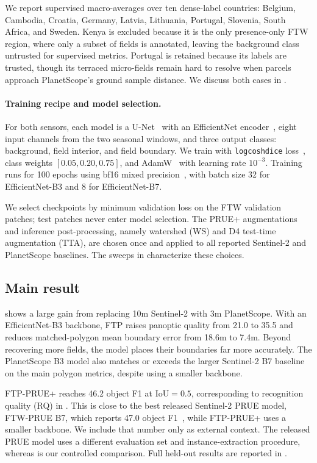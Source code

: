 \documentclass[10pt,twocolumn,letterpaper]{article}
\begin{document}
We report supervised macro-averages over ten dense-label countries: Belgium, Cambodia, Croatia, Germany, Latvia, Lithuania, Portugal, Slovenia, South Africa, and Sweden. Kenya is excluded because it is the only presence-only FTW region, where only a subset of fields is annotated, leaving the background class untrusted for supervised metrics. Portugal is retained because its labels are trusted, though its terraced micro-fields remain hard to resolve when parcels approach PlanetScope's ground sample distance. We discuss both cases in .

\paragraph{Training recipe and model selection.}
For both sensors, each model is a U-Net~\cite{ronneberger2015unet} with an EfficientNet encoder~\cite{tan2019efficientnet}, eight input channels from the two seasonal windows, and three output classes: background, field interior, and field boundary. We train with \texttt{logcoshdice} loss~\cite{milletari2016vnet,jadon2020losses}, class weights $[0.05,0.20,0.75]$, and AdamW~\cite{loshchilov2019adamw} with learning rate $10^{-3}$. Training runs for 100 epochs using bf16 mixed precision~\cite{micikevicius2018mixedprec}, with batch size 32 for EfficientNet-B3 and 8 for EfficientNet-B7.

We select checkpoints by minimum validation loss on the FTW validation patches; test patches never enter model selection. The PRUE+ augmentations and inference post-processing, namely watershed (WS) and D4 test-time augmentation (TTA), are chosen once and applied to all reported Sentinel-2 and PlanetScope baselines. The sweeps in  characterize these choices.

\subsection{Main result}
 shows a large gain from replacing 10m Sentinel-2 with 3m PlanetScope. With an EfficientNet-B3 backbone, FTP raises panoptic quality from 21.0 to 35.5 and reduces matched-polygon mean boundary error from 18.6m to 7.4m. Beyond recovering more fields, the model places their boundaries far more accurately. The PlanetScope B3 model also matches or exceeds the larger Sentinel-2 B7 baseline on the main polygon metrics, despite using a smaller backbone.

FTP-PRUE+ reaches 46.2 object F1 at IoU$=0.5$, corresponding to recognition quality (RQ) in . This is close to the best released Sentinel-2 PRUE model, FTW-PRUE B7, which reports 47.0 object F1~\cite{muhawenayo2026prue}, while FTP-PRUE+ uses a smaller backbone. We include that number only as external context. The released PRUE model uses a different evaluation set and instance-extraction procedure, whereas  is our controlled comparison. Full held-out results are reported in .
\end{document}
